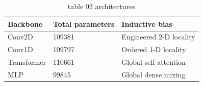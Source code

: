 \begin{table}[t]
\centering
\caption{table 02 architectures}
\label{tab:architectures}
\begin{tabular}{lll}
\hline
Backbone & Total parameters & Inductive bias \\
\hline
Conv2D & 109381 & Engineered 2-D locality \\
Conv1D & 109797 & Ordered 1-D locality \\
Transformer & 110661 & Global self-attention \\
MLP & 99845 & Global dense mixing \\
\hline
\end{tabular}
\end{table}
